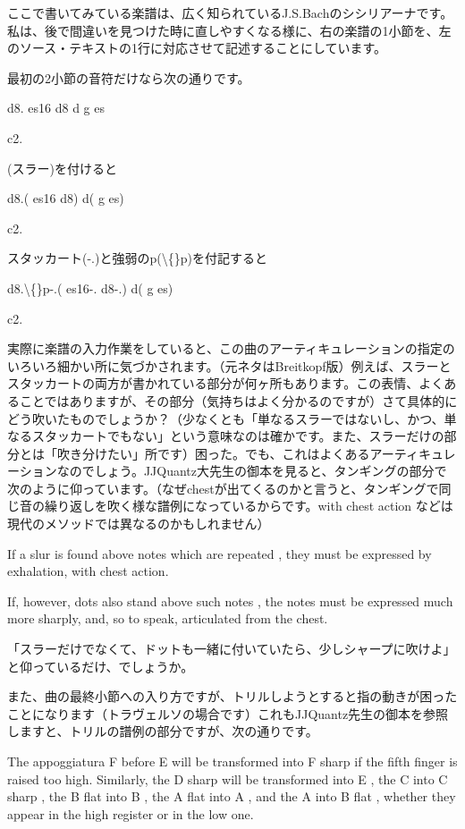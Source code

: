 ここで書いてみている楽譜は、広く知られているJ.S.Bachのシシリアーナです。私は、後で間違いを見つけた時に直しやすくなる様に、右の楽譜の1小節を、左のソース・テキストの1行に対応させて記述することにしています。

最初の2小節の音符だけなら次の通りです。

d8. es16 d8 d g es

c2.

(スラー)を付けると

d8.( es16 d8) d( g es)

c2.

スタッカート(-.)と強弱のp(\textbackslash\{\}p)を付記すると

d8.\textbackslash\{\}p-.( es16-. d8-.) d( g es)

c2.

実際に楽譜の入力作業をしていると、この曲のアーティキュレーションの指定のいろいろ細かい所に気づかされます。（元ネタはBreitkopf版）例えば、スラーとスタッカートの両方が書かれている部分が何ヶ所もあります。この表情、よくあることではありますが、その部分（気持ちはよく分かるのですが）さて具体的にどう吹いたものでしょうか？（少なくとも「単なるスラーではないし、かつ、単なるスタッカートでもない」という意味なのは確かです。また、スラーだけの部分とは「吹き分けたい」所です）困った。でも、これはよくあるアーティキュレーションなのでしょう。JJQuantz大先生の御本を見ると、タンギングの部分で次のように仰っています。（なぜchestが出てくるのかと言うと、タンギングで同じ音の繰り返しを吹く様な譜例になっているからです。with chest action などは現代のメソッドでは異なるのかもしれません）

If a slur is found above notes which are repeated , they must be expressed by exhalation, with chest action.

If, however, dots also stand above such notes , the notes must be expressed much more sharply, and, so to speak, articulated from the chest.

「スラーだけでなくて、ドットも一緒に付いていたら、少しシャープに吹けよ」と仰っているだけ、でしょうか。

また、曲の最終小節への入り方ですが、トリルしようとすると指の動きが困ったことになります（トラヴェルソの場合です）これもJJQuantz先生の御本を参照しますと、トリルの譜例の部分ですが、次の通りです。

The appoggiatura F before E will be transformed into F sharp if the fifth finger is raised too high. Similarly, the D sharp will be transformed into E , the C into C sharp , the B flat into B , the A flat into A , and the A into B flat , whether they appear in the high register or in the low one.

